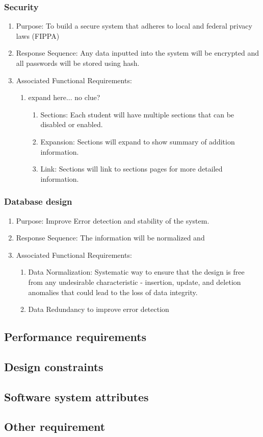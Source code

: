\documentclass{journal}
\begin{document}
\subsubsection{Security}
\begin{enumerate}
\item Purpose: To build a secure system that adheres to local and federal privacy laws (FIPPA)
\item Response Sequence: Any data inputted into the system will be encrypted and all passwords will be stored using hash.
\item Associated Functional Requirements:
\begin{enumerate}
\item expand here... no clue?
\begin{enumerate}
\item Sections: Each student will have multiple sections that can be disabled or enabled.
\item Expansion: Sections will expand to show summary of addition information.
\item Link: Sections will link to sections pages for more detailed information.
\end{enumerate}
\end{enumerate}
\end{enumerate}

\subsubsection{Database design}
\begin{enumerate}
\item Purpose: Improve Error detection and stability of the system.
\item Response Sequence: The information will be normalized and 
\item Associated Functional Requirements:
\begin{enumerate}
\item Data Normalization: Systematic way to ensure that the design is free from any undesirable characteristic - insertion, update, and deletion anomalies that could lead to the loss of data integrity.
\item Data Redundancy to improve error detection
\end{enumerate}
\end{enumerate}
\subsection{Performance requirements}

\subsection{Design constraints}
\subsection{Software system attributes}
\subsection{Other requirement}

\newpage

\end{document}
